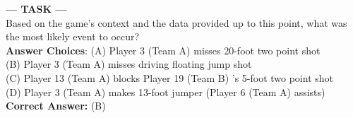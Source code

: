 \begin{ReasoningBox}[title=Abductive Reasoning]
        \vspace{0.2cm}
        \textbf{--- TASK ---} \\
        Based on the game's context and the data provided up to this point, what was the most likely event to occur? \\
        \textbf{Answer Choices}: (A) Player 3 (Team A) misses 20-foot two point shot \\ (B) Player 3 (Team A) misses driving floating jump shot \\  (C) Player 13 (Team A) blocks Player 19 (Team B) 's 5-foot two point shot \\ (D) Player 3 (Team A) makes 13-foot jumper (Player 6 (Team A) assists)\\
        \textbf{Correct Answer:} \textcolor{correctgreen}{(B)} \\
        \vspace{0.2cm}

    \vspace{0.5em}
\end{ReasoningBox}